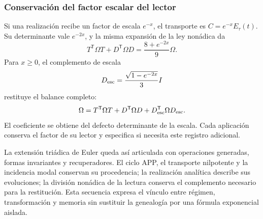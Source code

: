 \subsubsection{Conservación del factor escalar del lector}

Si una realización recibe un factor de escala \(e^{-x}\), el transporte
es \(C=e^{-x}E_\tau(t)\). Su determinante vale \(e^{-2x}\), y la misma
expansión de la ley nonádica da
\[
 T^\mathsf T\Omega T+D^\mathsf T\Omega D
 =\frac{8+e^{-2x}}9\Omega.
\]
Para \(x\ge0\), el complemento de escala
\[
 D_{\rm esc}=\frac{\sqrt{1-e^{-2x}}}{3}I
\]
restituye el balance completo:
\[
 \Omega=T^\mathsf T\Omega T+D^\mathsf T\Omega D
       +D_{\rm esc}^\mathsf T\Omega D_{\rm esc}.
\]
El coeficiente se obtiene del defecto determinante de la escala. Cada
aplicación conserva el factor de su lector y especifica si necesita
este registro adicional.

La extensión triádica de Euler queda así articulada con operaciones
generadas, formas invariantes y recuperadores. El ciclo APP, el
transporte nilpotente y la incidencia modal conservan su procedencia;
la realización analítica describe sus evoluciones; la división
nonádica de la lectura conserva el complemento necesario para la
restitución. Esta secuencia expresa el vínculo entre régimen,
transformación y memoria sin sustituir la genealogía por una fórmula
exponencial aislada.
